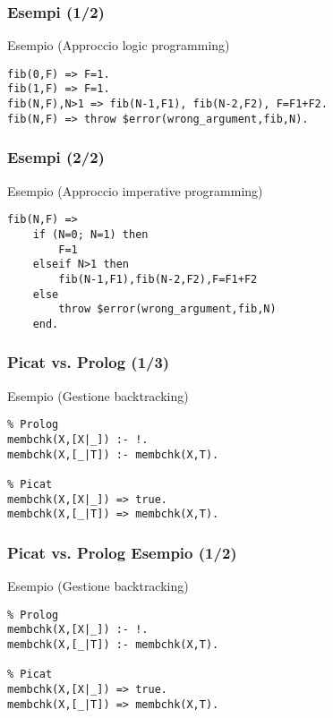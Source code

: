 \documentclass{beamer}
\begin{document}

\begin{frame}[fragile]
  \frametitle{Esempi (1/2)}
  \begin{exampleblock}{Esempio (Approccio logic programming)}
\begin{verbatim}
fib(0,F) => F=1.
fib(1,F) => F=1.
fib(N,F),N>1 => fib(N-1,F1), fib(N-2,F2), F=F1+F2.
fib(N,F) => throw $error(wrong_argument,fib,N).
\end{verbatim}
  \end{exampleblock}
\end{frame}


\begin{frame}[fragile]
  \frametitle{Esempi (2/2)}
  \begin{exampleblock}{Esempio (Approccio imperative programming)}
\begin{verbatim}
fib(N,F) =>
    if (N=0; N=1) then
        F=1
    elseif N>1 then
        fib(N-1,F1),fib(N-2,F2),F=F1+F2
    else
        throw $error(wrong_argument,fib,N)
    end.
\end{verbatim}
  \end{exampleblock}
\end{frame}


\begin{frame}[fragile]
  \frametitle{Picat vs. Prolog (1/3)}
  \begin{exampleblock}{Esempio (Gestione backtracking)}
\begin{verbatim}
% Prolog 
membchk(X,[X|_]) :- !.
membchk(X,[_|T]) :- membchk(X,T).

% Picat
membchk(X,[X|_]) => true.
membchk(X,[_|T]) => membchk(X,T).
\end{verbatim}
  \end{exampleblock}
\end{frame}


\begin{frame}[fragile]
  \frametitle{Picat vs. Prolog Esempio (1/2)}
  \begin{exampleblock}{Esempio (Gestione backtracking)}
\begin{verbatim}
% Prolog 
membchk(X,[X|_]) :- !.
membchk(X,[_|T]) :- membchk(X,T).

% Picat
membchk(X,[X|_]) => true.
membchk(X,[_|T]) => membchk(X,T).
\end{verbatim}
  \end{exampleblock}
\end{frame}
\end{document}
